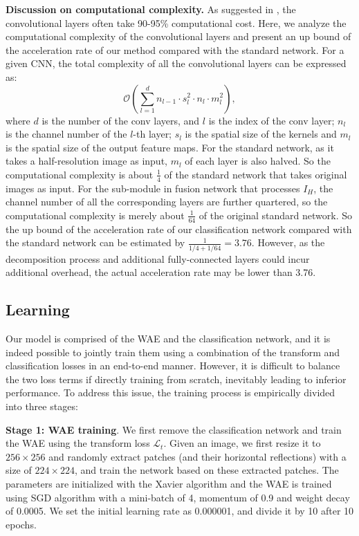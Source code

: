 \documentclass[letterpaper]{article} %
\begin{document}
\noindent\textbf{Discussion on computational complexity. } As suggested in \cite{he2015convolutional}, the convolutional layers often take 90-95\% computational cost. Here, we analyze the computational complexity of the convolutional layers and present an up bound of the acceleration rate of our method compared with the standard network. For a given CNN, the total complexity of all the convolutional layers can be expressed as:
\begin{equation}
   \mathcal{O}(\sum_{l=1}^{d}n_{l-1} \cdot s_l^2 \cdot n_l \cdot m_l^2),
\end{equation}
where $d$ is the number of the conv layers, and $l$ is the index of the conv layer; $n_l$ is the channel number of the $l$-th layer; $s_l$ is the spatial size of the kernels and $m_l$ is the spatial size of the output feature maps. For the standard network, as it takes a half-resolution image as input, $m_l$ of each layer is also halved. So the computational complexity is about $\frac{1}{4}$ of the standard network that takes original images as input. For the sub-module in fusion network that processes $I_H$, the channel number of all the corresponding layers are further quartered, so the computational complexity is merely about $\frac{1}{64}$ of the original standard network. So the up bound of the acceleration rate of our classification network compared with the standard network can be estimated by $\frac{1} {1/4 + 1/64}=3.76$. However, as the decomposition process and additional fully-connected layers could incur additional overhead, the actual acceleration rate may be lower than 3.76.

\subsection{Learning}
Our model is comprised of the WAE and the classification network, and it is indeed possible to jointly train them using a combination of the transform and classification losses in an end-to-end manner. However, it is difficult to balance the two loss terms if directly training from scratch, inevitably leading to inferior performance. To address this issue, the training process is empirically divided into three stages:

\noindent\textbf{Stage 1: WAE training}. We first remove the classification network and train the WAE using the transform loss $\mathcal{L}_t$. Given an image, we first resize it to $256 \times 256$ and randomly extract patches (and their horizontal reflections) with a size of $224 \times 224$, and train the network based on these extracted patches. The parameters are  initialized with the Xavier algorithm \cite{glorot2010understanding} and the WAE is trained using SGD algorithm with a mini-batch of 4, momentum of 0.9 and weight decay of 0.0005. We set the initial learning rate as 0.000001, and divide it by 10 after 10 epochs.
\end{document}
